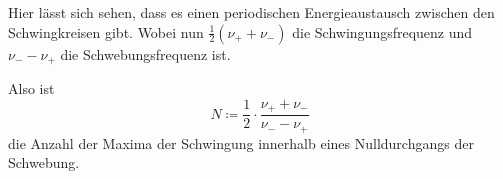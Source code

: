Hier lässt sich sehen, dass es einen periodischen Energieaustausch zwischen den Schwingkreisen gibt. 
Wobei nun $\frac{1}{2} (\nu _+ + \nu _-)$ die Schwingungsfrequenz und $\nu _- - \nu _+$ die Schwebungsfrequenz ist.\cite{V355}

Also ist 
\begin{equation}
    \label{eq:extrema}
    N \coloneq \frac{1}{2} \cdot \frac{ \nu _+ + \nu _-}{\nu _- - \nu _+}
\end{equation}
die Anzahl der Maxima der Schwingung innerhalb eines Nulldurchgangs der Schwebung.